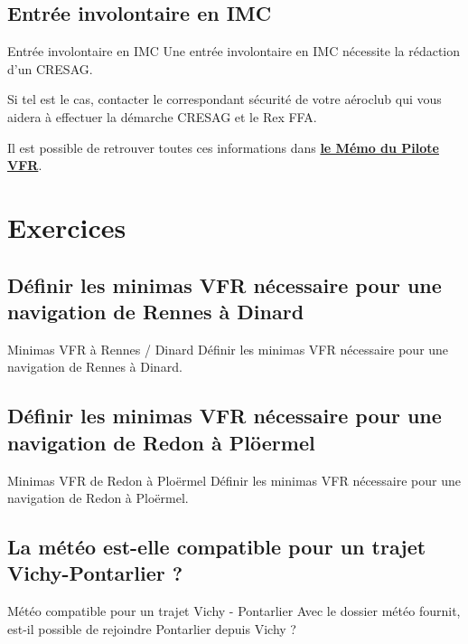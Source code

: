 \documentclass{beamer}
\begin{document}
\subsection{Entrée involontaire en IMC}
\begin{frame}{Entrée involontaire en IMC}
  Une entrée involontaire en IMC nécessite la rédaction d'un CRESAG.
  \vspace*{1em} \pause

  Si tel est le cas, contacter le correspondant sécurité de votre
  aéroclub qui vous aidera à effectuer la démarche CRESAG et le Rex
  FFA.
  \vspace*{1em} \pause

  Il est possible de retrouver toutes ces informations dans
  \textbf{\href{https://www.ffa-aero.fr/siteffaprod_web/fichiers_ffa/Piloter/MemoPiloteVFR.pdf}{le Mémo du Pilote VFR}}.
  
\end{frame}

\section{Exercices}
\subsection{Définir les minimas VFR nécessaire pour une navigation de Rennes à Dinard}

\begin{frame}{Minimas VFR à Rennes / Dinard}
  Définir les minimas VFR nécessaire pour une navigation de Rennes à Dinard.
\end{frame}

\subsection{Définir les minimas VFR nécessaire pour une navigation de Redon à Plöermel}
\begin{frame}{Minimas VFR de Redon à Ploërmel}
  Définir les minimas VFR nécessaire pour une navigation de Redon à Ploërmel.
\end{frame}

\subsection{La météo est-elle compatible pour un trajet Vichy-Pontarlier ?}
\begin{frame}{Météo compatible pour un trajet Vichy - Pontarlier}
  Avec le dossier météo fournit, est-il possible de rejoindre Pontarlier depuis Vichy ?
\end{frame}
\end{document}
